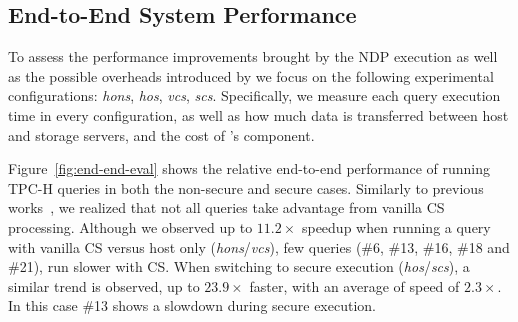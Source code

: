\subsection{End-to-End System Performance}
\label{subsec:perf-eval}
To assess the performance improvements brought by the NDP execution as well as the possible overheads introduced by \project{} we focus on the following experimental configurations:
\emph{hons}, \emph{hos}, \emph{vcs}, \emph{scs}.
Specifically, we measure each query execution time in every configuration, as well as how much data is transferred between host and storage servers, %
and the cost of \project{}'s component.

Figure~\ref{fig:end-end-eval} shows the relative end-to-end performance of running TPC-H queries in both the non-secure and secure cases. Similarly to previous works~\cite{246154,Koo:2017:STC:3123939.3124553,Gu:2016:BFN:3001136.3001154}, we realized that not all queries take advantage from vanilla CS processing.
Although we observed up to $11.2\times$ speedup when running a query with vanilla CS versus host only (\emph{hons}/\emph{vcs}), few queries (\#6, \#13, \#16, \#18 and \#21), run slower with CS.
When switching to secure execution (\emph{hos}/\emph{scs}), a similar trend is observed, up to $23.9\times$ faster, with an average of speed of $2.3\times$. 
In this case \#13 shows a slowdown during secure execution.


